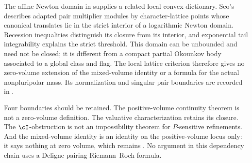 The affine Newton domain in
 supplies a related local
convex dictionary. Seo's \cite{Seo26ToricMultiplierV1} describes
adapted pair multiplier modules by character-lattice points whose
canonical translates lie in the strict interior of a logarithmic
Newton domain. Recession inequalities distinguish its closure from
its interior, and exponential tail integrability explains the strict
threshold. This domain can be unbounded and need not be closed;
it is different from a compact partial Okounkov body associated to
a global class and flag. The local lattice criterion therefore gives
no zero-volume extension of the mixed-volume identity or a formula
for the actual nonpluripolar mass. Its normalization and singular
pair boundaries are recorded in
.

Four boundaries should be retained.
The positive-volume continuity theorem is not a zero-volume definition.
The valuative characterization retains its closure.
The $\cI$-obstruction is not an impossibility theorem for
$P$-sensitive refinements.
And the mixed-volume identity is an identity on the positive-volume locus
only: it says nothing at zero volume, which remains
.  No argument in this dependency chain uses
a Deligne-pairing Riemann--Roch formula.
